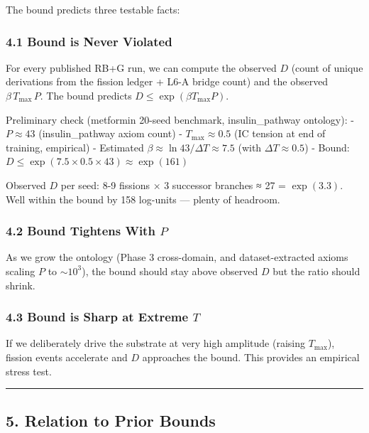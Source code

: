 \documentclass[
  11pt,
  a4paper,
]{article}
\begin{document}
The bound predicts three testable facts:

\subsubsection{4.1 Bound is Never
Violated}\label{bound-is-never-violated}

For every published RB+G run, we can compute the observed \(D\) (count
of unique derivations from the fission ledger + L6-A bridge count) and
the observed \(\beta \, T_\text{max} \, P\). The bound predicts
\(D \leq \exp(\beta T_\text{max} P)\).

Preliminary check (metformin 20-seed benchmark, insulin\_pathway
ontology): - \(P \approx 43\) (insulin\_pathway axiom count) -
\(T_\text{max} \approx 0.5\) (IC tension at end of training, empirical)
- Estimated \(\beta \approx \ln 43 / \Delta T \approx 7.5\) (with
\(\Delta T \approx 0.5\)) - Bound:
\(D \leq \exp(7.5 \times 0.5 \times 43) \approx \exp(161)\)

Observed \(D\) per seed: 8-9 fissions × 3 successor branches ≈ 27 =
\(\exp(3.3)\). Well within the bound by 158 log-units --- plenty of
headroom.

\subsubsection{\texorpdfstring{4.2 Bound Tightens With
\(P\)}{4.2 Bound Tightens With P}}\label{bound-tightens-with-p}

As we grow the ontology (Phase 3 cross-domain, and dataset-extracted
axioms scaling \(P\) to \(\sim 10^3\)), the bound should stay above
observed \(D\) but the ratio should shrink.

\subsubsection{\texorpdfstring{4.3 Bound is Sharp at Extreme
\(T\)}{4.3 Bound is Sharp at Extreme T}}\label{bound-is-sharp-at-extreme-t}

If we deliberately drive the substrate at very high amplitude (raising
\(T_\text{max}\)), fission events accelerate and \(D\) approaches the
bound. This provides an empirical stress test.

\begin{center}\rule{0.5\linewidth}{0.5pt}\end{center}

\subsection{5. Relation to Prior Bounds}\label{relation-to-prior-bounds}
\end{document}
